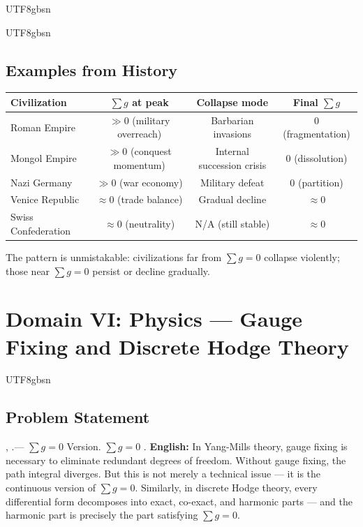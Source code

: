 \documentclass[11pt,a4paper]{article}
\begin{document}
\begin{CJK}{UTF8}{gbsn}
{\begin{CJK}{UTF8}{gbsn}
\subsection{Examples from History}
\begin{center}
\begin{tabular}{l|c|c|c}
    \textbf{Civilization} & $\sum g$ at peak & Collapse mode & Final $\sum g$ \\
    \hline
    Roman Empire & $\gg 0$ (military overreach) & Barbarian invasions & 0 (fragmentation) \\
    Mongol Empire & $\gg 0$ (conquest momentum) & Internal succession crisis & 0 (dissolution) \\
    Nazi Germany & $\gg 0$ (war economy) & Military defeat & 0 (partition) \\
    Venice Republic & $\approx 0$ (trade balance) & Gradual decline & $\approx 0$ \\
    Swiss Confederation & $\approx 0$ (neutrality) & N/A (still stable) & $\approx 0$ \\
\end{tabular}
\end{center}
The pattern is unmistakable: civilizations far from $\sum g = 0$ collapse violently;
those near $\sum g = 0$ persist or decline gradually.
\end{CJK}
\section{Domain VI: Physics --- Gauge Fixing and Discrete Hodge Theory}
\label{sec:physics}
\begin{CJK}{UTF8}{gbsn}
\subsection{Problem Statement}
\noindent
, .--- $\sum g = 0$ Version.
 $\sum g = 0$ .
\vspace{0.3cm}
\noindent
\textbf{English:} In Yang-Mills theory, gauge fixing is necessary to eliminate
redundant degrees of freedom. Without gauge fixing, the path integral diverges.
But this is not merely a technical issue --- it is the continuous version of
$\sum g = 0$. Similarly, in discrete Hodge theory, every differential form decomposes
into exact, co-exact, and harmonic parts --- and the harmonic part is precisely
the part satisfying $\sum g = 0$.

\end{CJK}}
\end{CJK}
\end{document}
